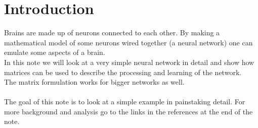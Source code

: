 \documentclass{article}
\title{\normalfont{Back propagation in a simple neural net}}
\begin{document}
\maketitle
\section*{Introduction}
Brains are made up of neurons connected to each other. By making a mathematical model of some neurons wired together (a neural network) one can emulate some aspects of a brain.
\\
In this note we will look at a very simple neural network in detail and show how matrices can be used to describe the processing and learning of the network.
\\The matrix formulation works for bigger networks as well.
\\
\\
The goal of this note is to look at a simple example in painstaking detail. For more background and analysis go to the links in the references at the end of the note.
\\
\\
\end{document}
